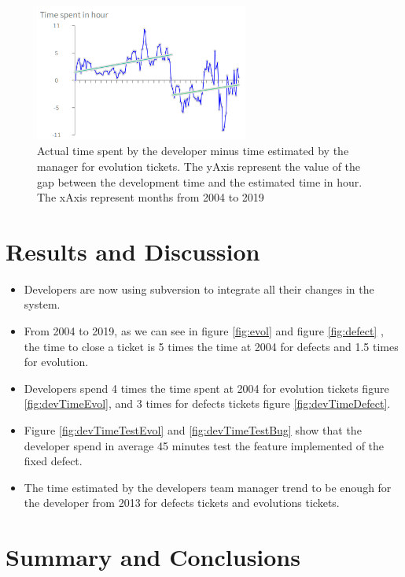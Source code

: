 \documentclass[10pt,conference]{IEEEtran}
\begin{document}
\begin{figure}[H]
  \centering
  \includegraphics[width=70mm]{./images/estimateEvol.png}
  \caption{Actual time spent by the developer minus time estimated by the manager for evolution tickets. 
    The yAxis represent the value of the gap between the development time and the estimated time in hour. 
    The xAxis represent months from 2004 to 2019}
  \label{fig:devEstEvol}
\end{figure}

\section{Results and Discussion}
\label{sec:results-discussion}

\begin{itemize}
    \item Developers are now using subversion to integrate all their changes in the system. 
    \item From 2004 to 2019, as we can see in figure \ref{fig:evol} and figure \ref{fig:defect} ,  the time to close a ticket is 5 times the time at 2004 for defects and 1.5 times for evolution.
    \item Developers spend 4 times the time spent at 2004 for evolution tickets figure \ref{fig:devTimeEvol}, and  3 times for defects tickets figure \ref{fig:devTimeDefect}.
    \item  Figure \ref{fig:devTimeTestEvol} and \ref{fig:devTimeTestBug} show that the developer spend in average 45 minutes test  the feature implemented of the fixed defect.
    \item The time estimated by the developers team manager trend to be enough for the developer from 2013 for defects tickets and evolutions tickets.
\end{itemize}

\section{Summary and Conclusions}
\label{sec:conclusion}
\end{document}
